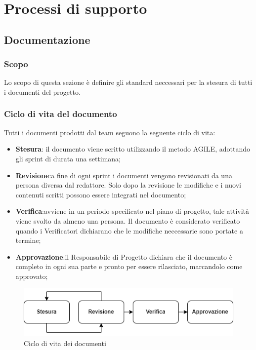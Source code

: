 \section{Processi di supporto}


\subsection{Documentazione}

\subsubsection{Scopo}
Lo scopo di questa sezione è definire gli standard neccessari per la stesura di tutti i documenti del progetto.

\subsubsection{Ciclo di vita del documento}
Tutti i documenti prodotti dal team seguono la seguente ciclo di vita:
\begin{itemize}
    \item \textbf{Stesura}: il documento viene scritto utilizzando il metodo AGILE, adottando gli sprint di durata una settimana; 
    \item \textbf{Revisione}:a fine di ogni sprint i documenti vengono revisionati da una persona diversa dal redattore. Solo dopo la revisione
				le modifiche e i nuovi contenuti scritti possono essere integrati nel documento;
    \item \textbf{Verifica}:avviene in un periodo specificato nel piano di progetto, tale attività viene svolto da almeno una persona. Il documento
				è considerato verificato quando i Verificatori dichiarano che le modifiche neccessarie sono portate a termine;
    \item \textbf{Approvazione}:il Responsabile di Progetto dichiara che il documento è completo in ogni sua
					parte e pronto per essere rilasciato, marcandolo come approvato;
\end{itemize}
\begin{figure}[H]
    \centering
    \includegraphics[scale=0.8]{img/ciclo_di_vita.png}
    \caption{Ciclo di vita dei documenti}
\end{figure}

